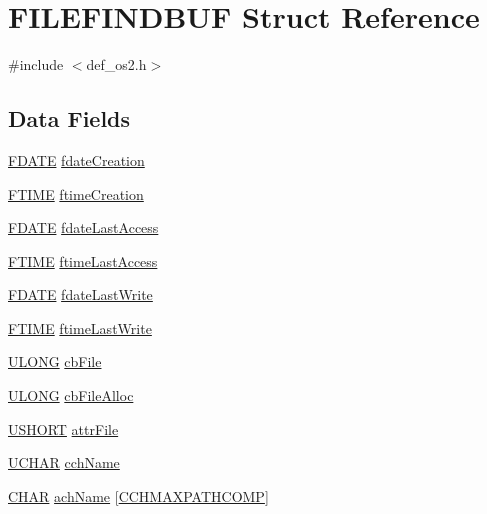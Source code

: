 \hypertarget{structFILEFINDBUF}{\section{F\+I\+L\+E\+F\+I\+N\+D\+B\+U\+F Struct Reference}
\label{structFILEFINDBUF}
}


{\ttfamily \#include $<$def\+\_\+os2.\+h$>$}

\subsection*{Data Fields}
\begin{DoxyCompactItemize}
\item 
\hyperlink{structFDATE}{F\+D\+A\+T\+E} \hyperlink{structFILEFINDBUF_a01241678f7d1e201357367188c92d36e}{fdate\+Creation}
\item 
\hyperlink{structFTIME}{F\+T\+I\+M\+E} \hyperlink{structFILEFINDBUF_a002765f96ab99ffba6f4dfb0eebba6d8}{ftime\+Creation}
\item 
\hyperlink{structFDATE}{F\+D\+A\+T\+E} \hyperlink{structFILEFINDBUF_a73856094cf923680e4a8a57d248e39e6}{fdate\+Last\+Access}
\item 
\hyperlink{structFTIME}{F\+T\+I\+M\+E} \hyperlink{structFILEFINDBUF_ad8c8318225106300774d3d535f66b47d}{ftime\+Last\+Access}
\item 
\hyperlink{structFDATE}{F\+D\+A\+T\+E} \hyperlink{structFILEFINDBUF_a27e4b54315abe4fe197cb0787967731c}{fdate\+Last\+Write}
\item 
\hyperlink{structFTIME}{F\+T\+I\+M\+E} \hyperlink{structFILEFINDBUF_a2bbbbf1d944946968d68dd47833c3d96}{ftime\+Last\+Write}
\item 
\hyperlink{def__os2_8h_af632da489ebc3708ec3ab6791ee53fa4}{U\+L\+O\+N\+G} \hyperlink{structFILEFINDBUF_a991798d9c57bed83fe5b4706ccfe8802}{cb\+File}
\item 
\hyperlink{def__os2_8h_af632da489ebc3708ec3ab6791ee53fa4}{U\+L\+O\+N\+G} \hyperlink{structFILEFINDBUF_a8f41e178685c9d9f23d285dd63b9ff82}{cb\+File\+Alloc}
\item 
\hyperlink{def__os2_8h_a5850d5316caf7f4cedd742fdf8cd7c02}{U\+S\+H\+O\+R\+T} \hyperlink{structFILEFINDBUF_a8a8dfb575701fd3240525d7d21cd46c9}{attr\+File}
\item 
\hyperlink{def__os2_8h_a4f4bb67531a9bf6f0b9c6ad76aeba587}{U\+C\+H\+A\+R} \hyperlink{structFILEFINDBUF_af929bbbf8e689a6f33ecf60a14b9ebb3}{cch\+Name}
\item 
\hyperlink{def__os2_8h_aebb9e13210d88d43e32e735ada43a425}{C\+H\+A\+R} \hyperlink{structFILEFINDBUF_af221d8680985f28c71f5caf0ca6f5ad0}{ach\+Name} \mbox{[}\hyperlink{def__os2_8h_abfa00b32dbe44725b610fee5cfd8e467}{C\+C\+H\+M\+A\+X\+P\+A\+T\+H\+C\+O\+M\+P}\mbox{]}
\end{DoxyCompactItemize}


